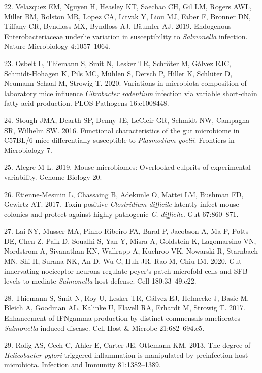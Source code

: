 \documentclass[11pt,]{article}
\begin{document}
\hypertarget{ref-Velazquez2019}{}
22. Velazquez EM, Nguyen H, Heasley KT, Saechao CH, Gil LM, Rogers AWL,
Miller BM, Rolston MR, Lopez CA, Litvak Y, Liou MJ, Faber F, Bronner DN,
Tiffany CR, Byndloss MX, Byndloss AJ, Bäumler AJ. 2019. Endogenous
Enterobacteriaceae underlie variation in susceptibility to
\emph{Salmonella} infection. Nature Microbiology 4:1057--1064.

\hypertarget{ref-Osbelt2020}{}
23. Osbelt L, Thiemann S, Smit N, Lesker TR, Schröter M, Gálvez EJC,
Schmidt-Hohagen K, Pils MC, Mühlen S, Dersch P, Hiller K, Schlüter D,
Neumann-Schaal M, Strowig T. 2020. Variations in microbiota composition
of laboratory mice influence \emph{Citrobacter rodentium} infection via
variable short-chain fatty acid production. PLOS Pathogens 16:e1008448.

\hypertarget{ref-Stough2016}{}
24. Stough JMA, Dearth SP, Denny JE, LeCleir GR, Schmidt NW, Campagna
SR, Wilhelm SW. 2016. Functional characteristics of the gut microbiome
in C57BL/6 mice differentially susceptible to \emph{Plasmodium yoelii}.
Frontiers in Microbiology 7.

\hypertarget{ref-Alegre2019}{}
25. Alegre M-L. 2019. Mouse microbiomes: Overlooked culprits of
experimental variability. Genome Biology 20.

\hypertarget{ref-EtienneMesmin2017}{}
26. Etienne-Mesmin L, Chassaing B, Adekunle O, Mattei LM, Bushman FD,
Gewirtz AT. 2017. Toxin-positive \emph{Clostridium difficile} latently
infect mouse colonies and protect against highly pathogenic \emph{C.
difficile}. Gut 67:860--871.

\hypertarget{ref-Lai2020}{}
27. Lai NY, Musser MA, Pinho-Ribeiro FA, Baral P, Jacobson A, Ma P,
Potts DE, Chen Z, Paik D, Soualhi S, Yan Y, Misra A, Goldstein K,
Lagomarsino VN, Nordstrom A, Sivanathan KN, Wallrapp A, Kuchroo VK,
Nowarski R, Starnbach MN, Shi H, Surana NK, An D, Wu C, Huh JR, Rao M,
Chiu IM. 2020. Gut-innervating nociceptor neurons regulate peyer's patch
microfold cells and SFB levels to mediate \emph{Salmonella} host
defense. Cell 180:33--49.e22.

\hypertarget{ref-Thiemann2017}{}
28. Thiemann S, Smit N, Roy U, Lesker TR, Gálvez EJ, Helmecke J, Basic
M, Bleich A, Goodman AL, Kalinke U, Flavell RA, Erhardt M, Strowig T.
2017. Enhancement of IFNgamma production by distinct commensals
ameliorates \emph{Salmonella}-induced disease. Cell Host \& Microbe
21:682--694.e5.

\hypertarget{ref-Rolig2013}{}
29. Rolig AS, Cech C, Ahler E, Carter JE, Ottemann KM. 2013. The degree
of \emph{Helicobacter pylori}-triggered inflammation is manipulated by
preinfection host microbiota. Infection and Immunity 81:1382--1389.
\end{document}
